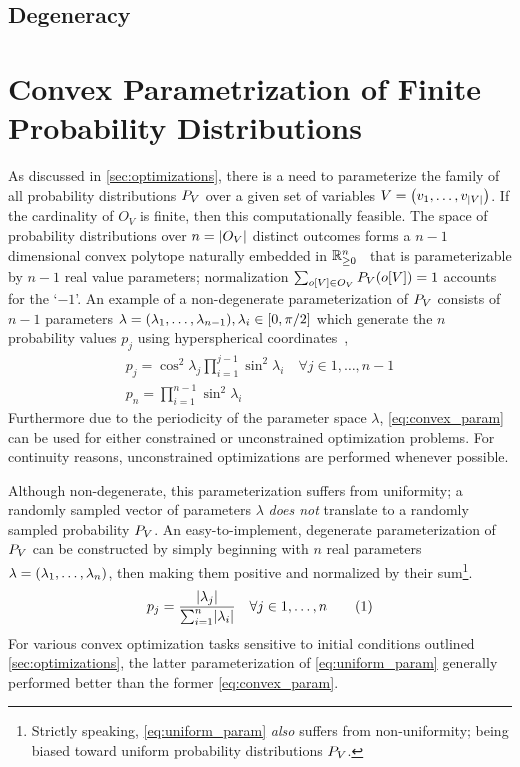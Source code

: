 \documentclass[aps, 10pt, english, twoside, pra, nofootinbib, longbibliography]{revtex4-1}
\theoremstyle{plain}
\theoremstyle{definition}
\theoremstyle{remark}
\newcommand{\outc}[1]{o\bs{#1}} %
\begin{document}
    \subsection{Degeneracy}
    \section{Convex Parametrization of Finite Probability Distributions}
    As discussed in \cref{sec:optimizations}, there is a need to parameterize the family of all probability distributions $\prob[V]$ over a given set of variables $V = \br{v_1, \ldots, v_{\abs{V}}}$. If the cardinality of $O_{V}$ is finite, then this computationally feasible. The space of probability distributions over $n = \abs{O_{V}}$ distinct outcomes forms a $n-1$ dimensional convex polytope naturally embedded in ${\mathbb{R}}_{\geq 0}^n$~\cite{Brunner_2013} that is parameterizable by $n-1$ real value parameters; normalization $\sum_{o\bs{V} \in O_V} \prob[V][\outc{V}] = 1$ accounts for the `$-1$'. An example of a non-degenerate parameterization of $\prob[V]$ consists of $n-1$ parameters $\lambda = \br{\lambda_1, \ldots, \lambda_{n-1}}, \lambda_i \in \bs{0, \pi/2}$ which generate the $n$ probability values $p_j$ using hyperspherical coordinates~\cite{Hedemann_2013, Spengler_2010_Unitary},
    \begin{equation}
    \begin{gathered}
        \label{eq:convex_param}
        p_j = \cos^2 \lambda_j \prod_{i=1}^{j-1} \sin^2 \lambda_i \quad \forall j \in 1, \ldots, n - 1 \\
        p_n = \prod_{i=1}^{n-1} \sin^2 \lambda_i
    \end{gathered}
    \end{equation}
    Furthermore due to the periodicity of the parameter space $\lambda$, \cref{eq:convex_param} can be used for either constrained or unconstrained optimization problems. For continuity reasons, unconstrained optimizations are performed whenever possible.

    Although non-degenerate, this parameterization suffers from uniformity; a randomly sampled vector of parameters $\lambda$ \textit{does not} translate to a randomly sampled probability $\prob[V]$. An easy-to-implement, degenerate parameterization of $\prob[V]$ can be constructed by simply beginning with $n$ real parameters $\lambda = \br{\lambda_1, \ldots, \lambda_n}$, then making them positive and normalized by their sum\footnote{Strictly speaking, \cref{eq:uniform_param} \textit{also} suffers from non-uniformity; being biased toward uniform probability distributions $\prob[V]$. }.
    \[ p_j = \f{\abs{\lambda_j}}{\sum_{i=1}^{n} \abs{\lambda_i}} \quad \forall j \in 1, \ldots, n \eq \label{eq:uniform_param} \]
    For various convex optimization tasks sensitive to initial conditions outlined \cref{sec:optimizations}, the latter parameterization of \cref{eq:uniform_param} generally performed better than the former \cref{eq:convex_param}.

    
\end{document}
